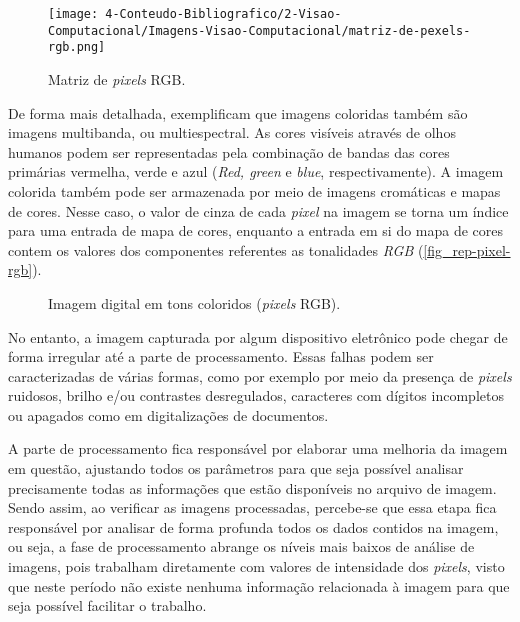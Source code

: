 \begin{figure}[h]
	\caption{\label{fig_rgb-representacao}Matriz de \textit{pixels} RGB.}
	\begin{center}
		\texttt{[image: 4-Conteudo-Bibliografico/2-Visao-Computacional/Imagens-Visao-Computacional/matriz-de-pexels-rgb.png]}
	\end{center}
	\centering {}
\end{figure}

De forma mais detalhada,  exemplificam que imagens coloridas também são imagens multibanda, ou multiespectral. As cores visíveis através de olhos humanos podem ser representadas pela combinação de bandas das cores primárias vermelha, verde e azul (\textit{Red, green} e \textit{blue}, respectivamente). A imagem colorida também pode ser armazenada por meio de imagens cromáticas e mapas de cores. Nesse caso, o valor de cinza de cada \textit{pixel} na imagem se torna um índice para uma entrada de mapa de cores, enquanto a entrada em si do mapa de cores contem os valores dos componentes referentes as tonalidades \textit{RGB} (\autoref{fig_rep-pixel-rgb}).

\clearpage

\begin{figure}[h]
	\caption{\label{fig_rep-pixel-rgb}Imagem digital em tons coloridos (\textit{pixels} RGB).}
	\begin{center}
	\end{center}
	\centering {}
\end{figure}

No entanto, a imagem capturada por algum dispositivo eletrônico pode chegar de forma irregular até a parte de processamento. Essas falhas podem ser caracterizadas de várias formas, como por exemplo por meio da presença de \textit{pixels} ruidosos, brilho e/ou contrastes desregulados, caracteres com dígitos incompletos ou apagados como em digitalizações de documentos.

A parte de processamento fica responsável por elaborar uma melhoria da imagem em questão, ajustando todos os parâmetros para que seja possível analisar precisamente todas as informações que estão disponíveis no arquivo de imagem. Sendo assim, ao verificar as imagens processadas, percebe-se que essa etapa fica responsável por analisar de forma profunda todos os dados contidos na imagem, ou seja, a fase de processamento abrange os níveis mais baixos de análise de imagens, pois trabalham diretamente com valores de intensidade dos \textit{pixels}, visto que neste período não existe nenhuma informação relacionada à imagem para que seja possível facilitar o trabalho.